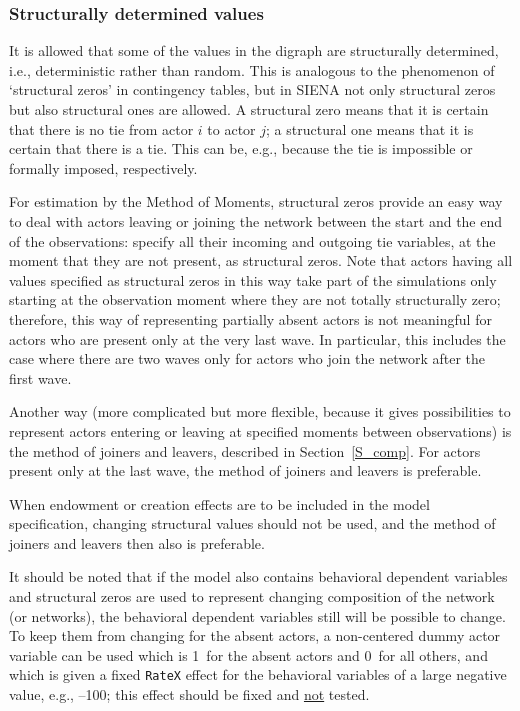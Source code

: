 \documentclass[a4paper,fleqn,11pt]{article}
\newcommand{\+}{\, + \,}
\newcommand{\SI}{{\sf SIENA }}
\begin{document}
\subsubsection{Structurally determined values}
\label{S_struct}

It is allowed that some of the values in the digraph are
structurally determined, i.e., deterministic rather than random.
This is analogous to the phenomenon of `structural zeros' in
contingency tables, but in \SI not only structural zeros but also
structural ones are allowed. A structural zero means that it is
certain that there is no tie from actor $i$ to actor $j$; a
structural one means that it is certain that there is a tie. This
can be, e.g., because the tie is impossible or formally imposed,
respectively.

For estimation by the Method of Moments,
structural zeros provide an easy way to deal with actors leaving
or joining the network between the start and the end
of the observations: specify all their incoming and outgoing tie
variables, at the moment that they are not present, as structural zeros.
Note that actors having all values specified as structural zeros in this way
take part of the simulations only starting at the observation moment
where they are not totally structurally zero;
therefore, this way of representing partially absent actors
is not meaningful for actors who are present only at the very last wave.
In particular, this includes the case where there are two waves only
for actors who join the network after the first wave.

Another way (more complicated but more flexible,
because it gives possibilities to represent actors
entering or leaving at specified moments between observations)
is the method of joiners and leavers, described in Section~\ref{S_comp}.
For actors present only at the last wave, the method of
joiners and leavers is preferable.

When endowment or creation effects are to be included in the
model specification, changing structural values should not be used,
and the method of joiners and leavers then also is preferable.

It should be noted that if the model also contains behavioral dependent
variables and structural zeros are used to represent changing
composition of the network (or networks), the behavioral dependent variables
still will be possible to change. To keep them from changing for the absent
actors, a non-centered dummy actor variable can be used which is 1~for the absent
actors and 0~for all others, and which is given a fixed \texttt{RateX} effect
for the behavioral variables of a large negative value, e.g., --100;
this effect should be fixed and \underline{not} tested.
\bigskip
\end{document}
